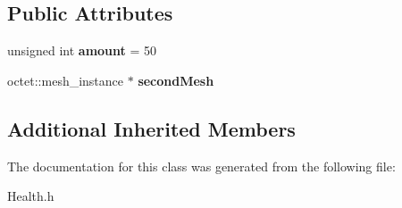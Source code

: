 \subsection*{Public Attributes}
\begin{DoxyCompactItemize}
\item 
\hypertarget{class_arena_1_1_power_ups_1_1_health_a1038838c4855b9b65845bc7e5517bcba}{unsigned int {\bfseries amount} = 50}\label{class_arena_1_1_power_ups_1_1_health_a1038838c4855b9b65845bc7e5517bcba}

\item 
\hypertarget{class_arena_1_1_power_ups_1_1_health_a89412df9e452d64d809322594279b25b}{octet\+::mesh\+\_\+instance $\ast$ {\bfseries second\+Mesh}}\label{class_arena_1_1_power_ups_1_1_health_a89412df9e452d64d809322594279b25b}

\end{DoxyCompactItemize}
\subsection*{Additional Inherited Members}


The documentation for this class was generated from the following file\+:\begin{DoxyCompactItemize}
\item 
Health.\+h\end{DoxyCompactItemize}
